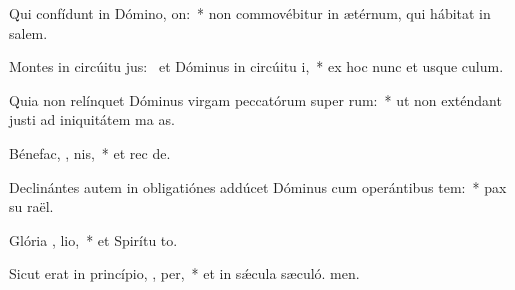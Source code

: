 \item Qui confídunt in Dómino,   on:~* non commovébitur in ætérnum, qui hábitat in salem.
\item Montes in circúitu jus:~\pscross{} et Dóminus in circúitu  i,~* ex hoc nunc et usque  culum.
\item Quia non relínquet Dóminus virgam peccatórum super  rum:~* ut non exténdant justi ad iniquitátem ma as.
\item Bénefac, , nis,~* et rec de.
\item Declinántes autem in obligatiónes addúcet Dóminus cum operántibus tem:~* pax su raël.
\item Glória ,  lio,~* et Spirítu to.
\item Sicut erat in princípio,  ,  per,~* et in sǽcula sæculó. men.
